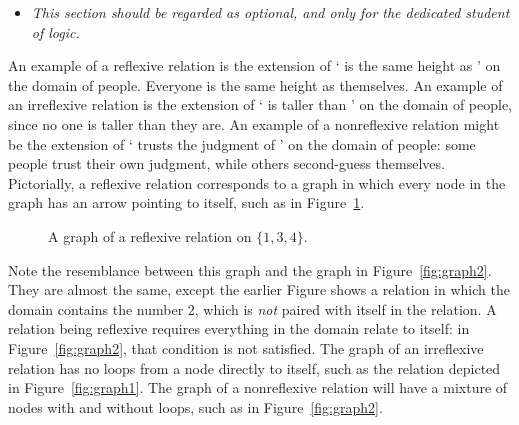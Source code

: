\begin{itemize}
 	\item \emph{This section should be regarded as optional, and only for the dedicated student of logic.}
 \end{itemize} 

An example of a reflexive relation is the extension of ` is the same height as ' on the domain of people. Everyone is the same height as themselves. An example of an irreflexive relation is the extension of ` is taller than ' on the domain of people, since no one is taller than they are. An example of a nonreflexive relation might be the extension of ` trusts the judgment of ' on the domain of people: some people trust their own judgment, while others second-guess themselves. Pictorially, a reflexive relation corresponds to a graph in which every node in the graph has an arrow pointing to itself, such as in Figure~\ref{fig:reflex}. 
\begin{figure}[t]
\caption{A graph of a reflexive relation on $\{1, 3, 4\}$.\label{fig:reflex}}
\end{figure} Note the resemblance between this graph and the graph in Figure~\ref{fig:graph2}. They are almost the same, except the earlier Figure shows a relation in which the domain contains the number $2$, which is \emph{not} paired with itself in the relation. A relation being reflexive requires everything in the domain relate to itself: in Figure~\ref{fig:graph2}, that condition is not satisfied.  The graph of an irreflexive relation has no loops from a node directly to itself, such as the relation depicted in Figure~\ref{fig:graph1}. The graph of a nonreflexive relation will have a mixture of nodes with and without loops, such as in Figure~\ref{fig:graph2}.

